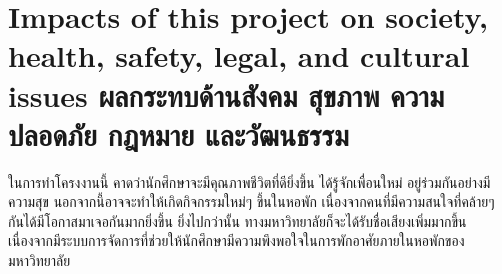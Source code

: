 
\section{\ifenglish%
Impacts of this project on society, health, safety, legal, and cultural issues
\else%
ผลกระทบด้านสังคม สุขภาพ ความปลอดภัย กฎหมาย และวัฒนธรรม
\fi}

ในการทำโครงงานนี้ คาดว่านักศึกษาจะมีคุณภาพชีวิตที่ดียิ่งขึ้น ได้รู้จักเพื่อนใหม่ อยู่ร่วมกันอย่างมีความสุข
นอกจากนี้อาจจะทำให้เกิดกิจกรรมใหม่ๆ ขึ้นในหอพัก เนื่องจากคนที่มีความสนใจที่คล้ายๆ กันได้มีโอกาสมาเจอกันมากยิ่งขึ้น
ยิ่งไปกว่านั้น ทางมหาวิทยาลัยก็จะได้รับชื่อเสียงเพิ่มมากขึ้น เนื่องจากมีระบบการจัดการที่ช่วยให้นักศึกษามีความพึงพอใจในการพักอาศัยภายในหอพักของมหาวิทยาลัย
